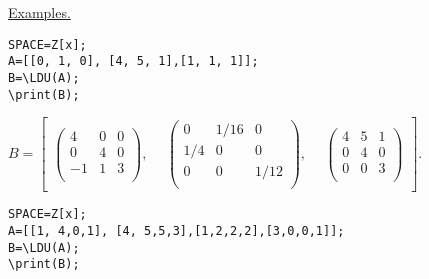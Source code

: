 \underline{Examples. }

\vspace*{-2mm}
\begin{verbatim}
SPACE=Z[x]; 
A=[[0, 1, 0], [4, 5, 1],[1, 1, 1]];
B=\LDU(A);
\print(B);
\end{verbatim}

{$B = \left[\begin{array}{ccc}
 \left(\begin{array}{ccc}
  4& 0&  0\\
  0& 4& 0\\
  -1& 1&  3\\
\end{array}\right),\ &\ 
\left(\begin{array}{ccc}
  0&1/16 &      0\\
  1/4& 0& 0\\
  0& 0&   1/12\\
\end{array}\right),\ &\ 
\left(\begin{array}{ccc}
  4& 5&  1\\
  0& 4& 0\\
  0& 0& 3\\
\end{array}\right) 
 \end{array}\right].$
} 

\begin{verbatim}
SPACE=Z[x]; 
A=[[1, 4,0,1], [4, 5,5,3],[1,2,2,2],[3,0,0,1]];
B=\LDU(A);
\print(B);
\end{verbatim}

